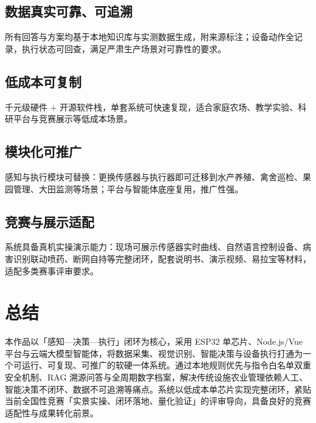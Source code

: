 ﻿\documentclass[11pt]{ctexart}
\begin{document}
\subsection{数据真实可靠、可追溯}
所有回答与方案均基于本地知识库与实测数据生成，附来源标注；设备动作全记录，执行状态可回查，满足严肃生产场景对可靠性的要求。

\subsection{低成本可复制}
千元级硬件 + 开源软件栈，单套系统可快速复现，适合家庭农场、教学实验、科研平台与竞赛展示等低成本场景。

\subsection{模块化可推广}
感知与执行模块可替换：更换传感器与执行器即可迁移到水产养殖、禽舍巡检、果园管理、大田监测等场景；平台与智能体底座复用，推广性强。

\subsection{竞赛与展示适配}
系统具备真机实操演示能力：现场可展示传感器实时曲线、自然语言控制设备、病害识别联动喷药、断网自持等完整闭环，配套说明书、演示视频、易拉宝等材料，适配多类赛事评审要求。

\section{总结}
本作品以「感知—决策—执行」闭环为核心，采用 ESP32 单芯片、Node.js/Vue 平台与云端大模型智能体，将数据采集、视觉识别、智能决策与设备执行打通为一个可运行、可复现、可推广的软硬一体系统。通过本地规则优先与指令白名单双重安全机制、RAG 溯源问答与全周期数字档案，解决传统设施农业管理依赖人工、智能决策不闭环、数据不可追溯等痛点。系统以低成本单芯片实现完整闭环，紧贴当前全国性竞赛「实景实操、闭环落地、量化验证」的评审导向，具备良好的竞赛适配性与成果转化前景。

\appendix
{}
\end{document}
